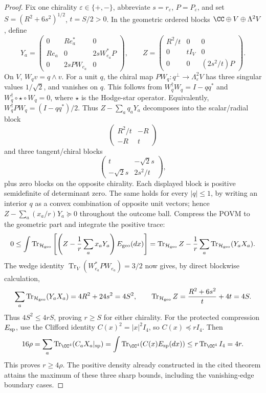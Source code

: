 \documentclass[11pt,a4paper]{article}
\begin{document}
\begin{proof}
Fix one chirality \(\varepsilon\in\{+,-\}\), abbreviate
\(s=r_\varepsilon\), \(P=P_\varepsilon\), and set
\(S=(R^2+6s^2)^{1/2}\), \(t=S/2>0\).
In the geometric ordered blocks \(\CC\oplus V\oplus\Lambda^2V\), define
\[
 Y_a=\begin{pmatrix}
 0&Re_a^*&0\\
 Re_a&0&2sW_{e_a}^*P\\
 0&2sPW_{e_a}&0
 \end{pmatrix},\qquad
 Z=\begin{pmatrix}
 R^2/t&0&0\\0&tI_V&0\\0&0&(2s^2/t)P
 \end{pmatrix}.
\]
On \(V\), \(W_qv=q\wedge v\). For a unit \(q\), the chiral map
\(PW_q:q^\perp\to\Lambda^2_\varepsilon V\) has three singular
values \(1/\sqrt2\), and vanishes on \(q\). This follows from
\(W_q^\dagger W_q=I-qq^*\) and
\(W_q^\dagger\circ\star\circ W_q=0\), where \(\star\) is the
Hodge-star operator. Equivalently,
\(W_q^\dagger PW_q=(I-qq^*)/2\).
Thus \(Z-\sum_aq_aY_a\) decomposes into the scalar/radial block
\[
 \begin{pmatrix}R^2/t&-R\\-R&t\end{pmatrix}
\]
and three tangent/chiral blocks
\[
 \begin{pmatrix}t&-\sqrt2s\\-\sqrt2s&2s^2/t\end{pmatrix},
\]
plus zero blocks on the opposite chirality. Each displayed block is
positive semidefinite of determinant zero. The same holds for every
\(|q|\le1\), by writing an interior \(q\) as a convex combination of
opposite unit vectors; hence
\(Z-\sum_a(x_a/r)Y_a\succeq0\) throughout the outcome ball.
Compress the POVM to the geometric part and integrate the positive trace:
\[
 0\le\int\operatorname{Tr}_{\mathcal H_{\rm geo}}
  \left[\left(Z-\frac1r\sum_ax_aY_a\right)E_{\rm geo}(dx)\right]
 =\operatorname{Tr}_{\mathcal H_{\rm geo}}Z
 -\frac1r\sum_a\operatorname{Tr}_{\mathcal H_{\rm geo}}(Y_aX_a).
\]
The wedge identity
\(\operatorname{Tr}_V(W_{e_a}^*PW_{e_a})=3/2\)
now gives, by direct blockwise calculation,
\[
 \sum_a\operatorname{Tr}_{\mathcal H_{\rm geo}}(Y_aX_a)
 =4R^2+24s^2=4S^2,
 \qquad
 \operatorname{Tr}_{\mathcal H_{\rm geo}}Z
 =\frac{R^2+6s^2}{t}+4t=4S.
\]
Thus \(4S^2\le4rS\), proving \(r\ge S\) for either chirality.
For the protected compression \(E_{\rm sp}\), use the Clifford identity
\(C(x)^2=|x|^2I_4\), so \(C(x)\preceq rI_4\). Then
\[
 16\rho=\sum_a\operatorname{Tr}_{\CC^4}(C_aX_a|_{\rm sp})
 =\int\operatorname{Tr}_{\CC^4}(C(x)E_{\rm sp}(dx))
 \le r\operatorname{Tr}_{\CC^4}I_4=4r.
\]
This proves \(r\ge4\rho\). The positive density already constructed
in the cited theorem attains the maximum of these three sharp bounds,
including the vanishing-edge boundary cases.
\end{proof}
\end{document}
